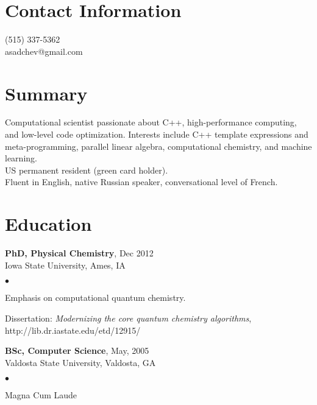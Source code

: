 \documentclass[overlap,line]{cv}
\newenvironment{list2}{
  \begin{list}{$\bullet$}{%
      \setlength{\itemsep}{0in}
      \setlength{\parsep}{0in} \setlength{\parskip}{0in}
      \setlength{\topsep}{0in} \setlength{\partopsep}{0in} 
      \setlength{\leftmargin}{0.2in}}}{\end{list}}
\begin{document}

\begin{resume}
\section{\sc Contact Information}
\vspace{.05in}
(515) 337-5362 \\
asadchev@gmail.com

\section{\sc Summary}
\vspace{.05in}
Computational scientist passionate about C++, high-performance computing, and low-level code optimization.
Interests include C++ template expressions and meta-programming, parallel linear algebra,
computational chemistry, and machine learning. \\
US permanent resident (green card holder).\\
Fluent in English, native Russian speaker, conversational level of French.


\section{\sc Education}
\vspace{.05in}
{\bf PhD, Physical Chemistry}, Dec 2012 \\
Iowa State University, Ames, IA
\vspace*{.02in}
\begin{list2}
\item Emphasis on computational quantum chemistry.
\item Dissertation: {\it Modernizing the core quantum chemistry algorithms}, \\
 {http://lib.dr.iastate.edu/etd/12915/}
\end{list2}

{\bf BSc, Computer Science},  May, 2005\\
Valdosta State University, Valdosta, GA
\vspace*{.02in}
\begin{list2}
\item Magna Cum Laude
\end{list2}



\end{resume}
\end{document}
